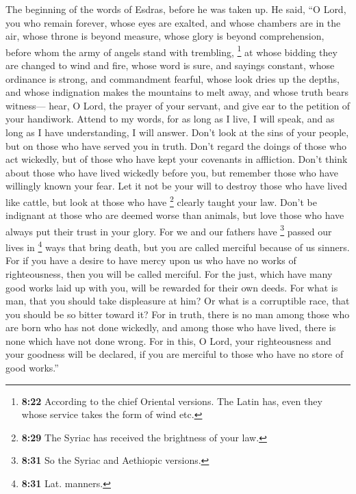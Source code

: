The beginning of the words of Esdras, before he was taken up. He said,
 ``O Lord, you who remain forever, whose eyes are
exalted, and whose chambers are in the air,  whose throne
is beyond measure, whose glory is beyond comprehension, before whom the
army of angels stand with trembling,  \footnote{\textbf{8:22}
  According to the chief Oriental versions. The Latin has, even they
  whose service takes the form of wind etc.} at whose bidding they are
changed to wind and fire, whose word is sure, and sayings constant,
whose ordinance is strong, and commandment fearful, 
whose look dries up the depths, and whose indignation makes the
mountains to melt away, and whose truth bears witness--- 
hear, O Lord, the prayer of your servant, and give ear to the petition
of your handiwork.  Attend to my words, for as long as I
live, I will speak, and as long as I have understanding, I will answer.
 Don't look at the sins of your people, but on those who
have served you in truth.  Don't regard the doings of
those who act wickedly, but of those who have kept your covenants in
affliction.  Don't think about those who have lived
wickedly before you, but remember those who have willingly known your
fear.  Let it not be your will to destroy those who have
lived like cattle, but look at those who have \footnote{\textbf{8:29}
  The Syriac has received the brightness of your law.} clearly taught
your law.  Don't be indignant at those who are deemed
worse than animals, but love those who have always put their trust in
your glory.  For we and our fathers have \footnote{\textbf{8:31}
  So the Syriac and Aethiopic versions.} passed our lives in \footnote{\textbf{8:31}
  Lat. manners.} ways that bring death, but you are called merciful
because of us sinners.  For if you have a desire to have
mercy upon us who have no works of righteousness, then you will be
called merciful.  For the just, which have many good
works laid up with you, will be rewarded for their own deeds.
 For what is man, that you should take displeasure at
him? Or what is a corruptible race, that you should be so bitter toward
it?  For in truth, there is no man among those who are
born who has not done wickedly, and among those who have lived, there is
none which have not done wrong.  For in this, O Lord,
your righteousness and your goodness will be declared, if you are
merciful to those who have no store of good works.''

